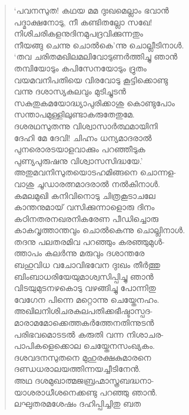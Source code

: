 \begin{verse}
‘പവനസുത! കഥയ മമ ദുഃഖമെല്ലാം ഭവാന്‍\\
പദ്മാക്ഷനോടു, നീ കണ്ടിതല്ലോ സഖേ!\\
നിശിചരികളനുദിനമുപദ്രവിക്കുന്നതും\\
നീയങ്ങു ചെന്നു ചൊല്‍കെ’ന്നു ചൊല്ലീടിനാള്‍.\\
‘തവ ചരിതമഖിലമലിവോടുണര്‍ത്തിച്ചു ഞാന്‍\\
തമ്പിയോടും കപിസേനയോടും ദ്രുതം\\
വയമവനിപതിയെ വിരവോടു കൂട്ടിക്കൊണ്ടു\\
വന്നു ദശാസ്യകുലവും മുടിച്ചുടന്‍\\
സകുതുകമയോദ്ധ്യാപുരിക്കാശു കൊണ്ടുപോം\\
സന്താപമുള്ളിലുണ്ടാകരുതേതുമേ.\\
ദശരഥസുതന്നു വിശ്വാസാര്‍ത്ഥമായിനി\\
ദേഹി മേ ദേവി! ചിഹ്നം ധന്യമാദരാല്‍\\
പുനരൊരടയാളവാക്കും പറഞ്ഞീടുക\\
പുണ്യപുരുഷനു വിശ്വാസസിദ്ധയേ.’\\
അതുമവനിസുതയൊടഹമിങ്ങനെ ചൊന്നള-\\
വാശു ചൂഡാരത്നമാദരാല്‍ നല്‍കിനാള്‍.\\
കമലമുഖി കനിവിനൊടു ചിത്രകൂടാചലേ\\
കാന്തനുമായ് വസിക്കുന്നാളൊരു ദിനം\\
കഠിനതരനഖരനികരേണ പീഡിച്ചൊരു\\
കാകവൃത്താന്തവും ചൊല്‍കെന്നു ചൊല്ലിനാള്‍.\\
തദനു പലതരമിവ പറഞ്ഞും കരഞ്ഞുമുള്‍-\\
ത്താപം കലര്‍ന്നു മരുവും ദശാന്തരേ\\
ബഹുവിധ വചോവിഭവേന ദുഃഖം തീര്‍ത്തു\\
ബിംബാധരിയേയുമാശ്വസിപ്പിച്ചു ഞാന്‍\\
വിടയുമുടനഴകൊടു വഴങ്ങിച്ചു പോന്നിതു\\
വേഗേന പിന്നെ മറ്റൊന്നു ചെയ്തേനഹം.\\
അഖിലനിശിചരകുലപതിക്കഭീഷ്ടാസ്പദ-\\
മാരാമമോക്കെത്തകര്‍ത്തേനതിന്നുടന്‍\\
പരിഭവമൊടടല്‍ കരുതി വന്ന നിശാചര-\\
പാപികളെക്കൊല ചെയ്തേനസംഖ്യകം.\\
ദശവദനസുതനെ മുഹുരക്ഷകുമാരനെ\\
ദണ്ഡധരാലയത്തിന്നയച്ചീടിനേന്‍.\\
അഥ ദശമുഖാത്മജബ്രഹ്മാസ്ത്രബദ്ധനാ-\\
യാശരാധീശനെക്കണ്ടു പറഞ്ഞു ഞാന്‍.\\
ലഘുതരമശേഷം ദഹിപ്പിച്ചിതു ബത\\

\end{verse}

